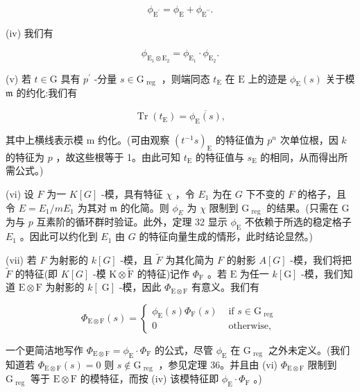 \documentclass[10pt]{article}
\begin{document}
\[
{\phi }_{{\mathrm{E}}^{\prime }} = {\phi }_{\mathrm{E}} + {\phi }_{{\mathrm{E}}^{\prime \prime }}.
\]

(iv) 我们有

\[
{\phi }_{{\mathrm{E}}_{1} \otimes  {\mathrm{E}}_{2}} = {\phi }_{{\mathrm{E}}_{1}} \cdot  {\phi }_{{\mathrm{E}}_{2}}.
\]

(v) 若 \(t \in  \mathrm{G}\) 具有 \({p}^{\prime }\) -分量 \(s \in  {\mathrm{G}}_{\text{ reg }}\) ，则端同态 \({t}_{\mathrm{E}}\) 在 \(\mathrm{E}\) 上的迹是 \({\phi }_{\mathrm{E}}\left( s\right)\) 关于模 \(\mathfrak{m}\) 的约化:我们有

\[
\operatorname{Tr}\left( {t}_{\mathrm{E}}\right)  = \overline{{\phi }_{\mathrm{E}}\left( s\right) },
\]

其中上横线表示模 m 约化。(可由观察 \({\left( {t}^{-1}s\right) }_{\mathrm{E}}\) 的特征值为 \({p}^{n}\) 次单位根，因 \(k\) 的特征为 \(p\) ，故这些根等于 1。由此可知 \({t}_{\mathrm{E}}\) 的特征值与 \({s}_{\mathrm{E}}\) 的相同，从而得出所需公式。)

(vi) 设 \(F\) 为一 \(K\left\lbrack  G\right\rbrack\) -模，具有特征 \(\chi\) ，令 \({E}_{1}\) 为在 \(G\) 下不变的 \(F\) 的格子，且令 \(E = {E}_{1}/m{E}_{1}\) 为其对 \(\mathfrak{m}\) 的化简。则 \({\phi }_{E}\) 为 \(\chi\) 限制到 \({\mathrm{G}}_{\text{ reg }}\) 的结果。(只需在 \(\mathrm{G}\) 为与 \(p\) 互素阶的循环群时验证。此外，定理 32 显示 \({\phi }_{\mathrm{E}}\) 不依赖于所选的稳定格子 \({E}_{1}\) 。因此可以约化到 \({E}_{1}\) 由 \(G\) 的特征向量生成的情形，此时结论显然。)

(vii) 若 \(F\) 为射影的 \(k\left\lbrack  G\right\rbrack\) -模，且 \(\widetilde{F}\) 为其化简为 \(F\) 的射影 \(A\left\lbrack  G\right\rbrack\) -模，我们将把 \(\widetilde{F}\) 的特征(即 \(K\left\lbrack  G\right\rbrack\) -模 \(\mathrm{K} \otimes  \widetilde{\mathrm{F}}\) 的特征)记作 \({\Phi }_{\mathrm{F}}\) 。若 \(\mathrm{E}\) 为任一 \(k\left\lbrack  \mathrm{G}\right\rbrack\) -模，我们知道 \(\mathrm{E} \otimes  \mathrm{F}\) 为射影的 \(k\left\lbrack  \mathrm{\;G}\right\rbrack\) -模，因此 \({\Phi }_{\mathrm{E} \otimes  \mathrm{F}}\) 有意义。我们有

\[
{\Phi }_{\mathrm{E} \otimes  \mathrm{F}}\left( s\right)  = \left\{  \begin{array}{ll} {\phi }_{\mathrm{E}}\left( s\right) {\Phi }_{\mathrm{F}}\left( s\right) & \text{ if }s \in  {\mathrm{G}}_{\text{ reg }} \\  0 & \text{ otherwise, } \end{array}\right.
\]

一个更简洁地写作 \({\Phi }_{\mathrm{E} \otimes  \mathrm{F}} = {\phi }_{\mathrm{E}} \cdot  {\Phi }_{\mathrm{F}}\) 的公式，尽管 \({\phi }_{\mathrm{E}}\) 在 \({\mathrm{G}}_{\text{ reg }}\) 之外未定义。(我们知道若 \({\Phi }_{\mathrm{E} \otimes  \mathrm{F}}\left( s\right)  = 0\) 则 \(s \notin  {\mathrm{G}}_{\text{ reg }}\) ，参见定理 36。并且由 (vi) \({\Phi }_{\mathrm{E} \otimes  \mathrm{F}}\) 限制到 \({\mathrm{G}}_{\text{ reg }}\) 等于 \(\mathrm{E} \otimes  \mathrm{F}\) 的模特征，而按 (iv) 该模特征即 \({\phi }_{\mathrm{E}} \cdot  {\Phi }_{\mathrm{F}}\) 。)
\end{document}

